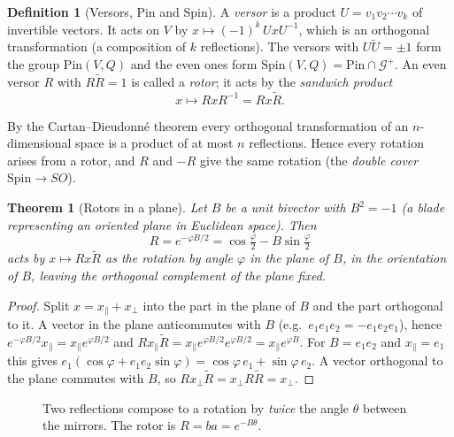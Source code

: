 \documentclass[11pt,a4paper]{article}
\newcounter{thm}[section]
\numberwithin{equation}{section}
\theoremstyle{definition}
\newtheorem{definition}[thm]{Definition}
\theoremstyle{plain}
\newtheorem{theorem}[thm]{Theorem}
\newcommand{\Pin}{\mathrm{Pin}}
\newcommand{\Spin}{\mathrm{Spin}}
\newcommand{\GA}{\mathcal{G}}
\newcommand{\rev}[1]{\widetilde{#1}}
\begin{document}
\begin{definition}[Versors, Pin and Spin]
A \emph{versor} is a product $U=v_1v_2\cdots v_k$ of invertible vectors. It acts on $V$ by
$x\mapsto(-1)^k\,UxU^{-1}$, which is an orthogonal transformation (a composition of $k$ reflections). The versors with $U\rev U=\pm1$ form the group $\Pin(V,Q)$ and the even ones form $\Spin(V,Q)=\Pin\cap\GA^+$. An even versor $R$ with $R\rev R=1$ is called a \emph{rotor}; it acts by the \emph{sandwich product}
\[
 x\longmapsto RxR^{-1}=Rx\rev R .
\]
\end{definition}

By the Cartan--Dieudonn\'e theorem every orthogonal transformation of an $n$-dimensional space is a product of at most $n$ reflections. Hence every rotation arises from a rotor, and $R$ and $-R$ give the same rotation (the \emph{double cover} $\Spin\to SO$).

\begin{theorem}[Rotors in a plane]\label{thm:rotor}
Let $B$ be a unit bivector with $B^2=-1$ (a blade representing an oriented plane in Euclidean space). Then
\[
 R=e^{-\varphi B/2}=\cos\tfrac\varphi2-B\sin\tfrac\varphi2
\]
acts by $x\mapsto Rx\rev R$ as the rotation by angle $\varphi$ in the plane of $B$, in the orientation of $B$, leaving the orthogonal complement of the plane fixed.
\end{theorem}
\begin{proof}
Split $x=x_\parallel+x_\perp$ into the part in the plane of $B$ and the part orthogonal to it. A vector in the plane anticommutes with $B$ (e.g.\ $e_1e_1e_2=-e_1e_2e_1$), hence $e^{-\varphi B/2}x_\parallel=x_\parallel e^{\varphi B/2}$ and
$Rx_\parallel\rev R=x_\parallel e^{\varphi B/2}e^{\varphi B/2}=x_\parallel e^{\varphi B}$. For $B=e_1e_2$ and $x_\parallel=e_1$ this gives $e_1(\cos\varphi+e_1e_2\sin\varphi)=\cos\varphi\,e_1+\sin\varphi\,e_2$. A vector orthogonal to the plane commutes with $B$, so $Rx_\perp\rev R=x_\perp R\rev R=x_\perp$.
\end{proof}

\begin{figure}[ht]
\centering
{}
\caption{Two reflections compose to a rotation by \emph{twice} the angle $\theta$ between the mirrors. The rotor is $R=ba=e^{-B\theta}$.}
\label{fig:tworefl}
\end{figure}
\end{document}
